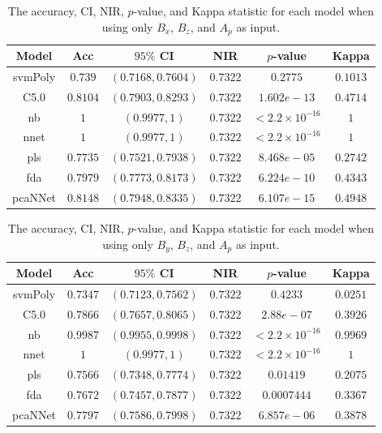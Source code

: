 \documentclass[preprint,12pt]{elsarticle}
\begin{document}
\begin{table}[!ht]
	\centering
	\begin{tabular}{|c|c|c|c|c|c|}
		\hline
		Model & Acc & $95\%$ CI & NIR & $p$-value & Kappa \\ \hline
		svmPoly & $0.739$ & $(0.7168, 0.7604)$ & $0.7322$ & $0.2775$ & $0.1013$ \\ \hline
		C5.0 & $0.8104$ & $(0.7903, 0.8293)$ & $0.7322$ & $1.602e-13$ & $0.4714$ \\ \hline
		nb & $1$ & $(0.9977, 1)$ & $0.7322$ & $< 2.2 \times {10}^{-16}$ & $1$ \\ \hline
		nnet & $1$ & $(0.9977, 1)$ & $0.7322$ & $< 2.2 \times {10}^{-16}$ & $1$ \\ \hline
		pls & $0.7735$ & $(0.7521, 0.7938)$ & $0.7322$ & $8.468e-05$ & $0.2742$ \\ \hline
		fda & $0.7979$ & $(0.7773, 0.8173)$ & $0.7322$ & $6.224e-10$ & $0.4343$ \\ \hline
		pcaNNet & $0.8148$ & $(0.7948, 0.8335)$ & $0.7322$ & $6.107e-15$ & $0.4948$ \\ \hline
	\end{tabular}
	\caption{The accuracy, CI, NIR, $p$-value, and Kappa statistic for each model when using only $B_{x}$, $B_{z}$, and $A_{p}$ as input.}
	\label{tab:stats:reverse:xzap}
\end{table}

\begin{table}[!ht]
	\centering
	\begin{tabular}{|c|c|c|c|c|c|}
		\hline
		Model & Acc & $95\%$ CI & NIR & $p$-value & Kappa \\ \hline
		svmPoly & $0.7347$ & $(0.7123, 0.7562)$ & $0.7322$ & $0.4233$ & $0.0251$ \\ \hline
		C5.0 & $0.7866$ & $(0.7657, 0.8065)$ & $0.7322$ & $2.88e-07$ & $0.3926$ \\ \hline
		nb & $0.9987$ & $(0.9955, 0.9998)$ & $0.7322$ & $< 2.2 \times {10}^{-16}$ & $0.9969$ \\ \hline
		nnet & $1$ & $(0.9977, 1)$ & $0.7322$ & $< 2.2 \times {10}^{-16}$ & $1$ \\ \hline
		pls & $0.7566$ & $(0.7348, 0.7774)$ & $0.7322$ & $0.01419$ & $0.2075$ \\ \hline
		fda & $0.7672$ & $(0.7457, 0.7877)$ & $0.7322$ & $0.0007444$ & $0.3367$ \\ \hline
		pcaNNet & $0.7797$ & $(0.7586, 0.7998)$ & $0.7322$ & $6.857e-06$ & $0.3878$ \\ \hline
	\end{tabular}
	\caption{The accuracy, CI, NIR, $p$-value, and Kappa statistic for each model when using only $B_{y}$, $B_{z}$, and $A_{p}$ as input.}
	\label{tab:stats:reverse:yzap}
\end{table}
\end{document}
